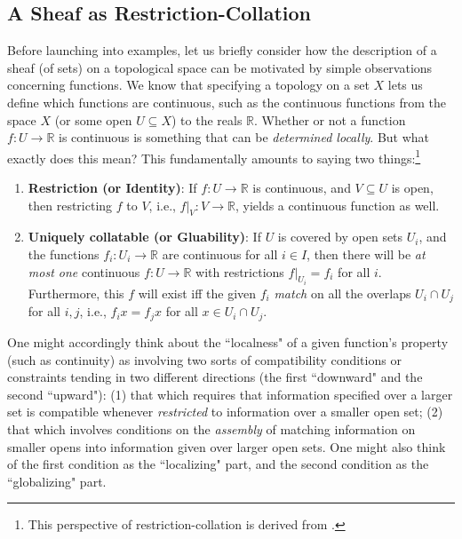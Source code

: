 \documentclass[11pt]{book}
\theoremstyle{definition}
\theoremstyle{definition}
\theoremstyle{definition}
\theoremstyle{theorem}
\theoremstyle{definition}
\begin{document}
\subsection{A Sheaf as Restriction-Collation}
\label{sec: restrict}
Before launching into examples, let us briefly consider how the description of a sheaf (of sets) on a topological space can be motivated by simple observations concerning functions. We know that specifying a topology on a set $X$ lets us define which functions are continuous, such as the continuous functions from the space $X$ (or some open $U \subseteq  X$) to the reals $\mathbb{R}$. Whether or not a function $f: U \rightarrow \mathbb{R}$ is continuous is something that can be \textit{determined locally}. But what exactly does this mean? This fundamentally amounts to saying two things:\footnote{This perspective of restriction-collation is derived from \cite{maclane_sheaves_1994}.}     
\begin{enumerate}
	\item \textbf{Restriction (or Identity)}: If $f: U \rightarrow \mathbb{R}$ is continuous, and $V \subseteq U$ is open, then restricting $f$ to $V$, i.e., $f|_V : V \rightarrow \mathbb{R}$, yields a continuous function as well.   
	\item \textbf{Uniquely collatable (or Gluability)}: If $U$ is covered by open sets $U_i$, and the functions $f_i: U_i \rightarrow \mathbb{R}$ are continuous for all $i \in I$, then there will be \textit{at most one} continuous $f: U \rightarrow \mathbb{R}$ with restrictions $f |_{U_i} = f_i$ for all $i$. Furthermore, this $f$ will exist iff the given $f_i$ \textit{match} on all the overlaps $U_i \cap U_j$ for all $i, j$, i.e., $f_i x = f_j x$ for all $x \in U_i \cap U_j$.
\end{enumerate}  
\noindent 
One might accordingly think about the ``localness" of a given function's property (such as continuity) as involving two sorts of compatibility conditions or constraints tending in two different directions (the first ``downward" and the second ``upward"): (1) that which requires that information specified over a larger set is compatible whenever \textit{restricted} to information over a smaller open set; (2) that which involves conditions on the \textit{assembly} of matching information on smaller opens into information given over larger open sets. One might also think of the first condition as the ``localizing" part, and the second condition as the ``globalizing" part. \par 
\end{document}
